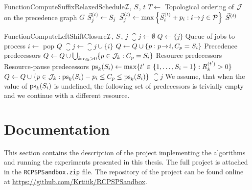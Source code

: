 \begin{alg}{Function}{ComputeSuffixRelaxedSchedule}{$\mathcal{I}$, $S$, $t$} \label{alg:suffix-relaxed-schedule}
\State $T \gets $ Topological ordering of $\mathcal{J}$ on the precedence graph $G$
        \State $\vec{S}^{(t)}_{j} \gets S_{j}$
    \Else
        \State $\vec{S}^{(t)}_{j} \gets \max\left\{\vec{S}^{(t)}_{i} + p_{i} : i \hspace{-0.2em} \rightarrow \hspace{-0.2em} j \in \mathcal{P} \right\}$
    \EndIf
\EndFor
\State \Return $\vec{S}^{(t)}$
\end{alg}

\newpage
\begin{alg}{Function}{ComputeLeftShiftClosure}{$\mathcal{I}$, $S$, $j$} \label{alg:left-shift-closure}
\State $\closure{j} \gets \emptyset$
\State $Q \gets \{j\}$ \Comment Queue of jobs to process
    \State $i \gets$ pop $Q$
    \State $\closure{j} \gets \closure{j} \cup \{ i \}$
    \State $Q \gets Q \cup \{ p : p \hspace{-0.2em} \rightarrow \hspace{-0.2em} i, C_{p} = S_{i}\}$
        \Comment Precedence predecessors
    \State $Q \gets Q \cup \bigcup_{k: r_{i k} > 0}\{ p \in \mathcal{J}_{k} : C_{p} = S_{i} \}$
        \Comment Resource predecessors
        \Comment Resource-pause predecessors
        \State $\mathrm{ps}_k(\jobstart{i}) \gets \max\{t^\prime \in \intinterval{1}{\jobstart{i}-1} : \capacity{k}{t^\prime} > 0\}$
        \State $Q \gets Q \cup \{ p \in \mathcal{J}_{k} : \mathrm{ps}_k(S_{i}) - p_{i} \leq C_{p} \leq \mathrm{ps}_k(S_{i}) \}$
    \EndFor
\EndWhile
\State \Return $\closure{j}$
\Statex
\Note  We assume, that when the value of $\mathrm{ps}_k(S_{i})$ is undefined,
       the following set of predecessors
\Notec is trivially empty and we continue with a different resource.
\end{alg}

\section{Documentation} \label{sec:attachments/documentation}

This section contains the description of the project implementing the algorithms and running the experiments
presented in this thesis.
The full project is attached in the \texttt{RCPSPSandbox.zip} file.
The repository of the project can be found online at \url{https://github.com/Krtiiik/RCPSPSandbox}.


